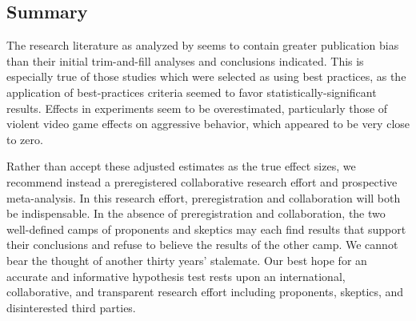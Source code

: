 \documentclass[man, mask]{apa6}
\begin{document}
\subsection{Summary}
The research literature as analyzed by \citet{Anderson:etal:2010} seems to contain greater publication bias than their initial trim-and-fill analyses and conclusions indicated. This is especially true of those studies which were selected as using best practices, as the application of best-practices criteria seemed to favor statistically-significant results. Effects in experiments seem to be overestimated, particularly those of violent video game effects on aggressive behavior, which appeared to be very close to zero. 

Rather than accept these adjusted estimates as the true effect sizes, we recommend instead a preregistered collaborative research effort and prospective meta-analysis. In this research effort, preregistration and collaboration will both be indispensable. In the absence of preregistration and collaboration, the two well-defined camps of proponents and skeptics may each find results that support their conclusions and refuse to believe the results of the other camp. We cannot bear the thought of another thirty years' stalemate. Our best hope for an accurate and informative hypothesis test rests upon an international, collaborative, and transparent research effort including proponents, skeptics, and disinterested third parties.

\newpage


\end{document}
